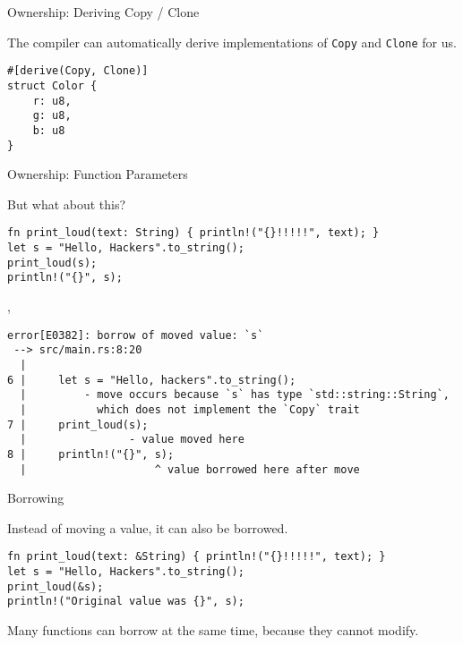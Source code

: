 
\begin{frame}[fragile]{Ownership: Deriving Copy / Clone}

The compiler can automatically derive implementations of \texttt{Copy} and
\texttt{Clone} for us.

\begin{verbatim}
#[derive(Copy, Clone)]
struct Color {
    r: u8,
    g: u8,
    b: u8
}
\end{verbatim}

\end{frame}


\begin{frame}[fragile]{Ownership: Function Parameters}

But what about this?

\begin{verbatim}
fn print_loud(text: String) { println!("{}!!!!!", text); }
let s = "Hello, Hackers".to_string();
print_loud(s);
println!("{}", s);
\end{verbatim}

\pause
\sep

\begin{verbatim}
error[E0382]: borrow of moved value: `s`
 --> src/main.rs:8:20
  |
6 |     let s = "Hello, hackers".to_string();
  |         - move occurs because `s` has type `std::string::String`,
  |           which does not implement the `Copy` trait
7 |     print_loud(s);
  |                - value moved here
8 |     println!("{}", s);
  |                    ^ value borrowed here after move
\end{verbatim}

\end{frame}


\begin{frame}[fragile]{Borrowing}

Instead of moving a value, it can also be borrowed.

\begin{verbatim}
fn print_loud(text: &String) { println!("{}!!!!!", text); }
let s = "Hello, Hackers".to_string();
print_loud(&s);
println!("Original value was {}", s);
\end{verbatim}

Many functions can borrow at the same time, because they cannot modify.

\end{frame}

